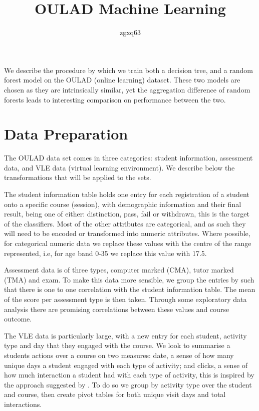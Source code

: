 \documentclass[11pt,a4paper]{article}
\begin{document}
\author{zgxq63}
\title{OULAD Machine Learning}
\date{}


We describe the procedure by which we train both a decision tree, and a random forest model on the OULAD (online learning) dataset. These two models are chosen as they are intrinsically similar, yet the aggregation difference of random forests leads to interesting comparison on performance between the two.

\section{Data Preparation}

The OULAD data set comes in three categories: student information, assessment data, and VLE data (virtual learning environment). We describe below the transformations that will be applied to the sets.

The student information table holds one entry for each registration of a student onto a specific course (session), with demographic information and their final result, being one of either: distinction, pass, fail or withdrawn, this is the target of the classifiers. Most of the other attributes are categorical, and as such they will need to be encoded or transformed into numeric attributes. Where possible, for categorical numeric data we replace these values with the centre of the range represented, i.e, for age band 0-35 we replace this value with 17.5.

Assessment data is of three types, computer marked (CMA), tutor marked (TMA) and exam. To make this data more sensible, we group the entries by such that there is one to one correlation with the student information table. The mean of the score per assessment type is then taken. Through some exploratory data analysis there are promising correlations between these values and course outcome.

The VLE data is particularly large, with a new entry for each student, activity type and day that they engaged with the course. We look to summarise a students actions over a course on two measures: date, a sense of how many unique days a student engaged with each type of activity; and clicks, a sense of how much interaction a student had with each type of activity, this is inspired by the approach suggested by \textcite{Jha2019}. To do so we group by activity type over the student and course, then create pivot tables for both unique visit days and total interactions.
\end{document}
